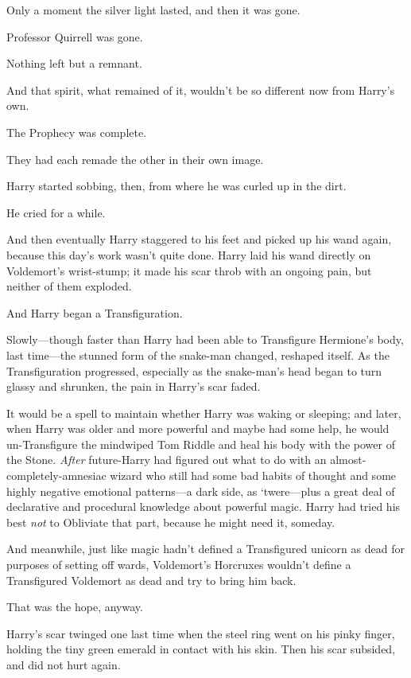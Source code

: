 Only a moment the silver light lasted, and then it was gone.

Professor Quirrell was gone.

Nothing left but a remnant.

And that spirit, what remained of it, wouldn't be so different now from Harry's
own.

The Prophecy was complete.

They had each remade the other in their own image.

Harry started sobbing, then, from where he was curled up in the dirt.

He cried for a while.

And then eventually Harry staggered to his feet and picked up his wand again,
because this day's work wasn't quite done.
\sbreak
Harry laid his wand directly on Voldemort's wrist-stump; it made his scar throb
with an ongoing pain, but neither of them exploded.

And Harry began a Transfiguration.

Slowly---though faster than Harry had been able to Transfigure Hermione's body,
last time---the stunned form of the snake-man changed, reshaped itself. As the
Transfiguration progressed, especially as the snake-man's head began to turn
glassy and shrunken, the pain in Harry's scar faded.

It would be a spell to maintain whether Harry was waking or sleeping; and
later, when Harry was older and more powerful and maybe had some help, he would
un-Transfigure the mindwiped Tom Riddle and heal his body with the power of the
Stone. \emph{After} future-Harry had figured out what to do with an
almost-completely-amnesiac wizard who still had some bad habits of thought and
some highly negative emotional patterns---a dark side, as `twere---plus a great
deal of declarative and procedural knowledge about powerful magic. Harry had
tried his best \emph{not} to Obliviate that part, because he might need it,
someday.

And meanwhile, just like magic hadn't defined a Transfigured unicorn as dead
for purposes of setting off wards, Voldemort's Horcruxes wouldn't define a
Transfigured Voldemort as dead and try to bring him back.

That was the hope, anyway.

Harry's scar twinged one last time when the steel ring went on his pinky
finger, holding the tiny green emerald in contact with his skin. Then his scar
subsided, and did not hurt again.

